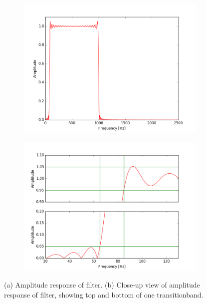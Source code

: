 \begin{figure}[h]
\centering
\begin{subfigure}{0.49\textwidth}
\centering
\includegraphics[width=\textwidth]{figures/filtertest/freq_response1.png}
\caption{}
\label{fig:freq_filt1}
\end{subfigure}
\begin{subfigure}{0.49\textwidth}
\centering
\includegraphics[width=\textwidth]{figures/filtertest/freq_response2.png}
\caption{}
\label{fig:freq_filt2}
\end{subfigure}
\caption{(a) Amplitude response of filter. (b) Close-up view of amplitude response of filter, showing top and bottom of one transitionband.}
\label{fig:freq_filt}
\end{figure}

